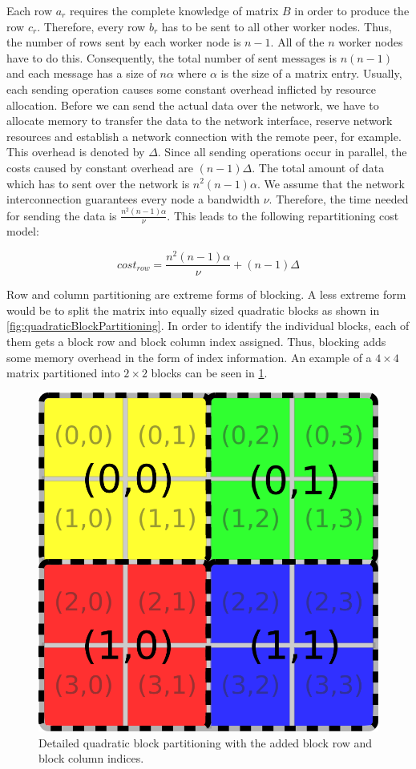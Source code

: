 Each row $a_r$ requires the complete knowledge of matrix $B$ in order to produce the row $c_r$.
Therefore, every row $b_r$ has to be sent to all other worker nodes.
Thus, the number of rows sent by each worker node is $n-1$.
All of the $n$ worker nodes have to do this.
Consequently, the total number of sent messages is $n(n-1)$ and each message has a size of $n\alpha$ where $\alpha$ is the size of a matrix entry.
Usually, each sending operation causes some constant overhead inflicted by resource allocation.
Before we can send the actual data over the network, we have to allocate memory to transfer the data to the network interface, reserve network resources and establish a network connection with the remote peer, for example.
This overhead is denoted by $\Delta$.
Since all sending operations occur in parallel, the costs caused by constant overhead are $(n-1)\Delta$.
The total amount of data which has to sent over the network is $n^2(n-1)\alpha$.
We assume that the network interconnection guarantees every node a bandwidth $\nu$.
Therefore, the time needed for sending the data is $\frac{n^2(n-1)\alpha}{\nu}$.
This leads to the following repartitioning cost model:

\begin{displaymath}
	cost_{row} = \frac{n^2(n-1)\alpha}{\nu} + (n-1)\Delta
\end{displaymath}

Row and column partitioning are extreme forms of blocking.
A less extreme form would be to split the matrix into equally sized quadratic blocks as shown in \cref{fig:quadraticBlockPartitioning}.
In order to identify the individual blocks, each of them gets a block row and block column index assigned.
Thus, blocking adds some memory overhead in the form of index information.
An example of a $4\times 4$ matrix partitioned into $2\times 2$ blocks can be seen in \cref{fig:quadraticBlockPartitioningDetailed}.

\begin{figure}[!h]
	\centering
	\includegraphics[width=0.25\linewidth]{images/quadraticBLockPartitioningDetailed.png}
	\caption{Detailed quadratic block partitioning with the added block row and block column indices.}
	\label{fig:quadraticBlockPartitioningDetailed}
\end{figure}

